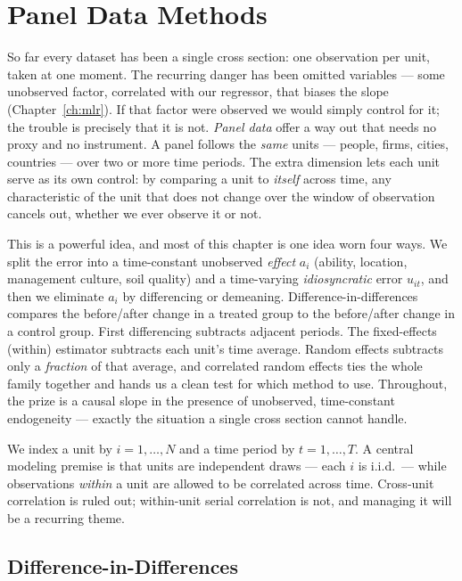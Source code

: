 \chapter{Panel Data Methods}
\label{ch:panel}

So far every dataset has been a single cross section: one observation per unit, taken at one moment. The recurring danger has been omitted variables --- some unobserved factor, correlated with our regressor, that biases the slope (Chapter~\ref{ch:mlr}). If that factor were observed we would simply control for it; the trouble is precisely that it is not. \emph{Panel data} offer a way out that needs no proxy and no instrument. A panel follows the \emph{same} units --- people, firms, cities, countries --- over two or more time periods. The extra dimension lets each unit serve as its own control: by comparing a unit to \emph{itself} across time, any characteristic of the unit that does not change over the window of observation cancels out, whether we ever observe it or not.

This is a powerful idea, and most of this chapter is one idea worn four ways. We split the error into a time-constant unobserved \emph{effect} $a_i$ (ability, location, management culture, soil quality) and a time-varying \emph{idiosyncratic} error $u_{it}$, and then we eliminate $a_i$ by differencing or demeaning. Difference-in-differences compares the before/after change in a treated group to the before/after change in a control group. First differencing subtracts adjacent periods. The fixed-effects (within) estimator subtracts each unit's time average. Random effects subtracts only a \emph{fraction} of that average, and correlated random effects ties the whole family together and hands us a clean test for which method to use. Throughout, the prize is a causal slope in the presence of unobserved, time-constant endogeneity --- exactly the situation a single cross section cannot handle.

We index a unit by $i=1,\dots,N$ and a time period by $t=1,\dots,T$. A central modeling premise is that units are independent draws --- each $i$ is i.i.d.\ --- while observations \emph{within} a unit are allowed to be correlated across time. Cross-unit correlation is ruled out; within-unit serial correlation is not, and managing it will be a recurring theme.

\section{Difference-in-Differences}
\label{sec:did}

